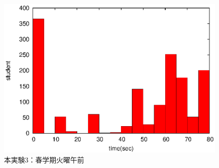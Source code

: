 \documentclass[a4paper,10pt]{jarticle}
\begin{document}
\begin{figure}[htpb]                        
\begin{minipage} {0.5\hsize}                             
\begin{center}                              
\includegraphics[bb=0 0 390 248,clip,width=\hsize]{oTu12_2_hist.eps}   
\caption{本実験3：春学期火曜午前}                              
\label{oTu12_2}                                
\end{center}                                    
\end{minipage}                                 
\begin{minipage} {0.5\hsize}                             
\end{minipage}                                 
\end{figure}                                 
\fi


\end{document}
